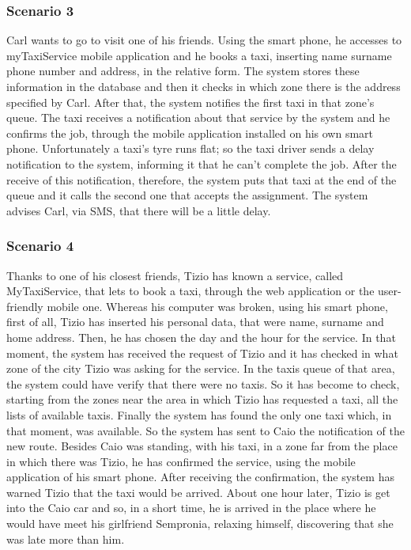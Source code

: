 		\subsubsection{Scenario 3}
		Carl wants to go to visit one of his friends. Using the smart phone, he accesses to myTaxiService mobile application and he books a taxi, inserting name surname phone number and address, in the relative form. The system stores these information in the database and then it checks in which zone there is the address specified by Carl. After that, the system notifies the first taxi in that zone's queue. The taxi receives a notification about that service by the system and he confirms the job, through the mobile application installed on his own smart phone. 
		Unfortunately a taxi's tyre runs flat; so the taxi driver sends a delay notification to the system, informing it that he can't complete the job. After the receive of this notification, therefore, the system puts that taxi at the end of the queue and it calls the second one that accepts the assignment. The system advises Carl, via SMS, that there will be a little delay.
		
		\subsubsection{Scenario 4}
		Thanks to one of his closest friends, Tizio has known a service, called MyTaxiService, that lets to book a taxi, through the web application or the user-friendly mobile one.
		Whereas his computer was broken, using his smart phone, first of all, Tizio has inserted his personal data, that were name, surname and home address. Then, he has chosen the day and the hour for the service. In that moment, the system has received the request of Tizio and it has checked in what zone of the city Tizio was asking for the service. In the taxis queue of that area, the system could have verify that there were no taxis. So it has become to check, starting from the zones near the area in which Tizio has requested a taxi, all the lists of available taxis. 
		Finally the system has found the only one taxi which, in that moment, was available. So the system has sent to Caio the notification of the new route. Besides Caio was standing, with his taxi, in a zone far from the place in which there was Tizio, he has confirmed the service, using the mobile application of his smart phone. After receiving the confirmation, the system has warned Tizio that the taxi would be arrived.
		About one hour later, Tizio is get into the Caio car and so, in a short time, he is arrived in the place where he would have meet his girlfriend Sempronia, relaxing himself, discovering that she was late more than him.

